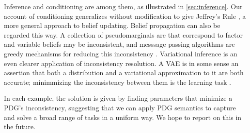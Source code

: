 \documentclass[letterpaper]{article} %
\theoremstyle{plain}
\theoremstyle{definition}
\theoremstyle{remark}
\begin{document}
%
Inference and conditioning are among them, as illustrated in \cref{sec:inference}. Our account of conditioning generalizes without modification to give Jeffrey's Rule \cite{Jeffrey68}, a more general approach to belief updating.
%
Belief propagation can also be regarded this way. 
A collection of pseudomarginals are that correspond to factor and variable
beliefs may be inconsistent, and messsage passing algorithms are greedy
mechanisms for reducing this inconsistency \cite{wainwright2008graphical}.
%
Variational inference is an even clearer application of inconsistency resolution.
A VAE is in some sense an assertion that both
a distribution and a variational approximation to it are both accurate;
minimmizing the inconsistency between them is the learning task
\cite{kingma2013autoencoding}. 

In each example, the solution is given by finding parameters that 
minimize a PDG's inconsistency, suggesting that we can apply 
PDG semantics to capture and solve a broad range of tasks in a uniform way.
We hope to report on this in the future.

\end{document}
